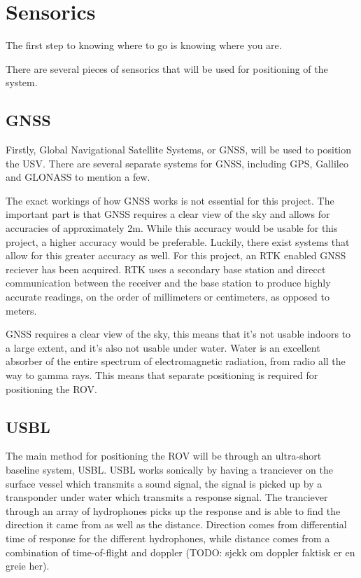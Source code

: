 \documentclass[class=article, crop=false, draft=true]{standalone}
\begin{document}
\section{Sensorics}
The first step to knowing where to go is knowing where you are.

There are several pieces of sensorics that will be used for positioning of the system.

\subsection{GNSS}
Firstly, Global Navigational Satellite Systems, or GNSS, will be used to position the USV. There are several separate systems for GNSS, including GPS, Gallileo and GLONASS to mention a few.

The exact workings of how GNSS works is not essential for this project. The important part is that GNSS requires a clear view of the sky and allows for accuracies of approximately 2m. While this accuracy would be usable for this project, a higher accuracy would be preferable. Luckily, there exist systems that allow for this greater accuracy as well. For this project, an RTK enabled GNSS reciever has been acquired. RTK uses a secondary base station and direcct communication between the receiver and the base station to produce highly accurate readings, on the order of millimeters or centimeters, as opposed to meters.

GNSS requires a clear view of the sky, this means that it's not usable indoors to a large extent, and it's also not usable under water. Water is an excellent absorber of the entire spectrum of electromagnetic radiation, from radio all the way to gamma rays. This means that separate positioning is required for positioning the ROV.

\subsection{USBL}
The main method for positioning the ROV will be through an ultra-short baseline system, USBL. USBL works sonically by having a tranciever on the surface vessel which transmits a sound signal, the signal is picked up by a transponder under water which transmits a response signal. The tranciever through an array of hydrophones picks up the response and is able to find the direction it came from as well as the distance. Direction comes from differential time of response for the different hydrophones, while distance comes from a combination of time-of-flight and doppler (TODO: sjekk om doppler faktisk er en greie her).
\end{document}
